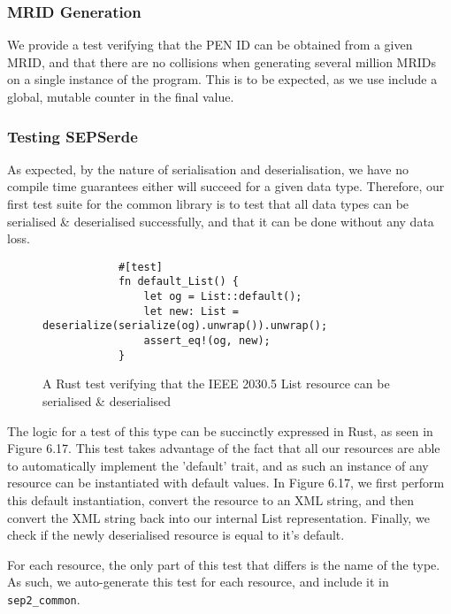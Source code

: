 \subsubsection{MRID Generation}
We provide a test verifying that the PEN ID can be obtained from a given MRID, and that there are no collisions when generating several million MRIDs on a single instance of the program. This is to be expected, as we use include a global, mutable counter in the final value.

\subsubsection{Testing SEPSerde}
As expected, by the nature of serialisation and deserialisation, we have no compile time guarantees either will succeed for a given data type.
Therefore, our first test suite for the common library is to test that all data types can be serialised \& deserialised successfully, and that it can be done without any data loss.

\begin{figure}[h]
    \begin{center}
        \begin{lstlisting}
            #[test]
            fn default_List() {
                let og = List::default();
                let new: List = deserialize(serialize(og).unwrap()).unwrap();
                assert_eq!(og, new);
            }
        \end{lstlisting}
        \label{fig:yaserdetest}
        \vspace{-10pt}
        \caption{A Rust test verifying that the IEEE 2030.5 List resource can be serialised \& deserialised}
    \end{center}
\end{figure}

The logic for a test of this type can be succinctly expressed in Rust, as seen in Figure 6.17. 
This test takes advantage of the fact that all our resources are able to automatically implement the 'default' trait, and as such an instance of any resource can be instantiated with default values.
In Figure 6.17, we first perform this default instantiation, convert the resource to an XML string, and then convert the XML string back into our internal List representation. 
Finally, we check if the newly deserialised resource is equal to it's default.

For each resource, the only part of this test that differs is the name of the type. As such, we auto-generate this test for each resource, and include it in \texttt{sep2\_common}.

